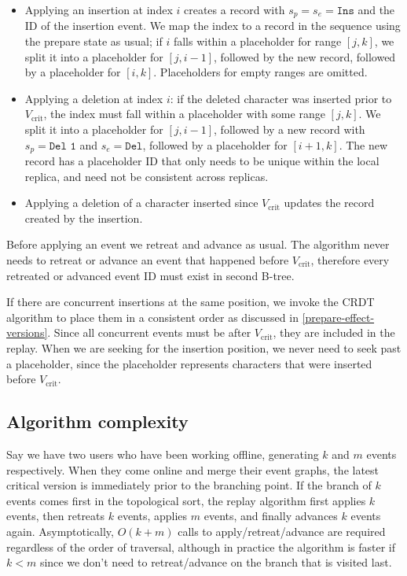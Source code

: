 \documentclass[sigplan,10pt]{acmart}
\begin{document}
\begin{itemize}
\item Applying an insertion at index $i$ creates a record with $s_p = s_e = \texttt{Ins}$ and the ID of the insertion event. We map the index to a record in the sequence using the prepare state as usual; if $i$ falls within a placeholder for range $[j, k]$, we split it into a placeholder for $[j, i-1]$, followed by the new record, followed by a placeholder for $[i, k]$. Placeholders for empty ranges are omitted.
\item Applying a deletion at index $i$: if the deleted character was inserted prior to $V_\mathrm{crit}$, the index must fall within a placeholder with some range $[j, k]$. We split it into a placeholder for $[j, i-1]$, followed by a new record with $s_p = \texttt{Del 1}$ and $s_e = \texttt{Del}$, followed by a placeholder for $[i+1, k]$. The new record has a placeholder ID that only needs to be unique within the local replica, and need not be consistent across replicas.
\item Applying a deletion of a character inserted since $V_\mathrm{crit}$ updates the record created by the insertion.
\end{itemize}

Before applying an event we retreat and advance as usual.
The algorithm never needs to retreat or advance an event that happened before $V_\mathrm{crit}$, therefore every retreated or advanced event ID must exist in second B-tree.

If there are concurrent insertions at the same position, we invoke the CRDT algorithm to place them in a consistent order as discussed in \autoref{prepare-effect-versions}.
Since all concurrent events must be after $V_\mathrm{crit}$, they are included in the replay.
When we are seeking for the insertion position, we never need to seek past a placeholder, since the placeholder represents characters that were inserted before $V_\mathrm{crit}$.

\subsection{Algorithm complexity}\label{complexity}

Say we have two users who have been working offline, generating $k$ and $m$ events respectively.
When they come online and merge their event graphs, the latest critical version is immediately prior to the branching point.
If the branch of $k$ events comes first in the topological sort, the replay algorithm first applies $k$ events, then retreats $k$ events, applies $m$ events, and finally advances $k$ events again.
Asymptotically, $O(k+m)$ calls to apply/retreat/advance are required regardless of the order of traversal, although in practice the algorithm is faster if $k<m$ since we don't need to retreat/advance on the branch that is visited last.
\end{document}
